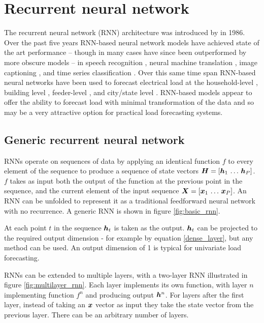 \section{Recurrent neural network}
The recurrent neural network (RNN) architecture was introduced by \citet{Rumelhart1986} in 1986.
Over the past five years RNN-based neural network models have achieved state of the art performance -- though in many cases have since been outperformed by more obscure models -- in speech recognition \cite{Chiu2017}, neural machine translation \cite{luong2015effective}, image captioning \cite{yao2017boosting}, and time series classification \cite{Karim2018}.
Over this same time span RNN-based neural networks have been used to forecast electrical load at the household-level \cite{Kong2017}\cite{Shi2018}, building level \cite{Zheng2017a}, feeder-level \cite{Bedi2018}, and city/state level \cite{Narayan2017}\cite{Din2017}.
RNN-based models appear to offer the ability to forecast load with minimal transformation of the data and so may be a very attractive option for practical load forecasting systems.

\subsection{Generic recurrent neural network}
RNNs operate on sequences of data by applying an identical function $f$ to every element of the sequence to produce a sequence of state vectors ${\bm{H}} = [{\bm{h}}_1 \, \ldots \, {\bm{h}}_P]$.
$f$ takes as input both the output of the function at the previous point in the sequence, and the current element of the input sequence ${\bm{X}} = [{\bm{x}}_1 \, \ldots \, {\bm{x}}_P]$.
An RNN can be unfolded to represent it as a traditional feedforward neural network with no recurrence.
A generic RNN is shown in figure \ref{fig:basic_rnn}.

At each point $t$ in the sequence ${\bm{h}}_t$ is taken as the output.
${\bm{h}}_t$ can be projected to the required output dimension - for example by equation \ref{dense_layer}, but any method can be used.
An output dimension of 1 is typical for univariate load forecasting.

RNNs can be extended to multiple layers, with a two-layer RNN illustrated in figure \ref{fig:multilayer_rnn}.
Each layer implements its own function, with layer $n$ implementing function $f^n$ and producing output ${\bm{h}}^n$.
For layers after the first layer, instead of taking an ${\bm{x}}$ vector as input they take the state vector from the previous layer.
There can be an arbitrary number of layers.


